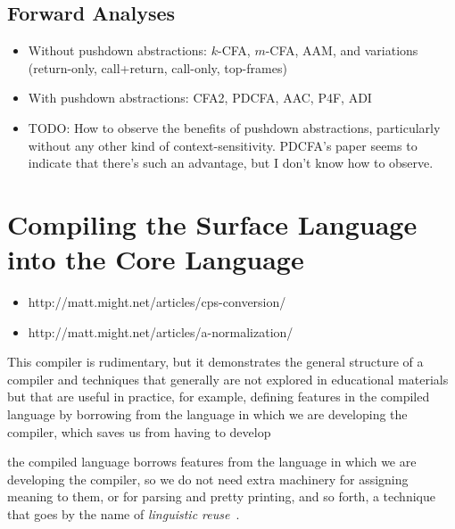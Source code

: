 \documentclass[12pt, oneside]{book}
\begin{document}
\section{Forward Analyses}

\begin{itemize}
  \item Without pushdown abstractions: \(k\)-CFA, \(m\)-CFA, AAM, and variations (return-only, call+return, call-only, top-frames)
  \item With pushdown abstractions: CFA2, PDCFA, AAC, P4F, ADI
  \item TODO: How to observe the benefits of pushdown abstractions, particularly without any other kind of context-sensitivity. PDCFA’s paper seems to indicate that there’s such an advantage, but I don’t know how to observe.
\end{itemize}

\appendix

\chapter{Compiling the Surface Language into the Core Language}
\label{section:compiling-the-surface-language-into-the-core-language}

\begin{itemize}
  \item http://matt.might.net/articles/cps-conversion/
  \item http://matt.might.net/articles/a-normalization/
\end{itemize}

This compiler is rudimentary, but it demonstrates the general structure of a compiler and techniques that generally are not explored in educational materials but that are useful in practice, for example, defining features in the compiled language by borrowing from the language in which we are developing the compiler, which saves us from having to develop 

the compiled language borrows features from the language in which we are developing the compiler, so we do not need extra machinery for assigning meaning to them, or for parsing and pretty printing, and so forth, a technique that goes by the name of \emph{linguistic reuse}~\cite{linguistic-reuse}.

\backmatter
\end{document}
